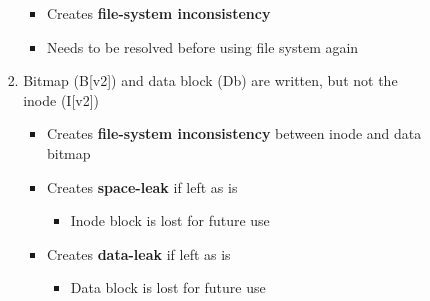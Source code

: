 \documentclass[12pt]{article}
\begin{document}
\begin{enumerate}[1.]
\begin{enumerate}[a)]
\begin{itemize}
\begin{enumerate}[1)]
                \begin{itemize}
                    \item Creates \textbf{file-system inconsistency}
                    \item Needs to be resolved before using file system again
                \end{itemize}

                \bigskip

                \item Bitmap (B[v2]) and data block (Db) are written, but not the inode (I[v2])

                \bigskip

                \begin{itemize}
                    \item Creates \textbf{file-system inconsistency} between inode and data bitmap
                    \item Creates \textbf{space-leak} if left as is
                    \begin{itemize}
                        \item Inode block is lost for future use
                    \end{itemize}
                    \item Creates \textbf{data-leak} if left as is

                    \begin{itemize}
                        \item Data block is lost for future use
                    \end{itemize}
                \end{itemize}

                \bigskip
            \end{enumerate}
        \end{itemize}
    \end{enumerate}
\end{enumerate}
\end{document}
